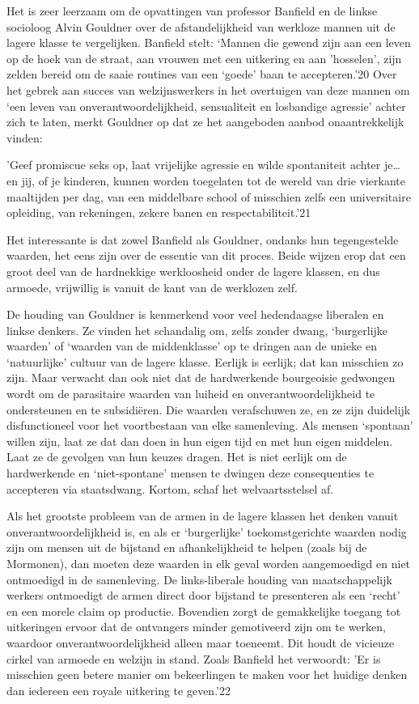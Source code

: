 \documentclass[
  a5paper,
  smalldemyvopaper,10pt,twoside,onecolumn,openright,extrafontsizes,hidelinks]{memoir}
\renewenvironment{quote}%
               {\list{}{\rightmargin=.6cm\leftmargin=.6cm}%
                \itshape \item[]}%
               {\endlist}
\begin{document}
Het is zeer leerzaam om de opvattingen van professor Banfield en de
linkse socioloog Alvin Gouldner over de afstandelijkheid van werkloze
mannen uit de lagere klasse te vergelijken. Banfield stelt: `Mannen die
gewend zijn aan een leven op de hoek van de straat, aan vrouwen met een
uitkering en aan 'hosselen', zijn zelden bereid om de saaie routines van
een `goede' baan te accepteren.'20 Over het gebrek aan succes van
welzijnswerkers in het overtuigen van deze mannen om `een leven van
onverantwoordelijkheid, sensualiteit en losbandige agressie' achter zich
te laten, merkt Gouldner op dat ze het aangeboden aanbod onaantrekkelijk
vinden:

\begin{quote}
'Geef promiscue seks op, laat vrijelijke agressie en wilde spontaniteit
achter je\ldots{} en jij, of je kinderen, kunnen worden toegelaten tot
de wereld van drie vierkante maaltijden per dag, van een middelbare
school of misschien zelfs een universitaire opleiding, van rekeningen,
zekere banen en respectabiliteit.'21
\end{quote}

Het interessante is dat zowel Banfield als Gouldner, ondanks hun
tegengestelde waarden, het eens zijn over de essentie van dit proces.
Beide wijzen erop dat een groot deel van de hardnekkige werkloosheid
onder de lagere klassen, en dus armoede, vrijwillig is vanuit de kant
van de werklozen zelf.

De houding van Gouldner is kenmerkend voor veel hedendaagse liberalen en
linkse denkers. Ze vinden het schandalig om, zelfs zonder dwang,
`burgerlijke waarden' of `waarden van de middenklasse' op te dringen aan
de unieke en `natuurlijke' cultuur van de lagere klasse. Eerlijk is
eerlijk; dat kan misschien zo zijn. Maar verwacht dan ook niet dat de
hardwerkende bourgeoisie gedwongen wordt om de parasitaire waarden van
luiheid en onverantwoordelijkheid te ondersteunen en te subsidiëren. Die
waarden verafschuwen ze, en ze zijn duidelijk disfunctioneel voor het
voortbestaan van elke samenleving. Als mensen `spontaan' willen zijn,
laat ze dat dan doen in hun eigen tijd en met hun eigen middelen. Laat
ze de gevolgen van hun keuzes dragen. Het is niet eerlijk om de
hardwerkende en `niet-spontane' mensen te dwingen deze consequenties te
accepteren via staatsdwang. Kortom, schaf het welvaartsstelsel af.

Als het grootste probleem van de armen in de lagere klassen het denken
vanuit onverantwoordelijkheid is, en als er `burgerlijke'
toekomstgerichte waarden nodig zijn om mensen uit de bijstand en
afhankelijkheid te helpen (zoals bij de Mormonen), dan moeten deze
waarden in elk geval worden aangemoedigd en niet ontmoedigd in de
samenleving. De links-liberale houding van maatschappelijk werkers
ontmoedigt de armen direct door bijstand te presenteren als een `recht'
en een morele claim op productie. Bovendien zorgt de gemakkelijke
toegang tot uitkeringen ervoor dat de ontvangers minder gemotiveerd zijn
om te werken, waardoor onverantwoordelijkheid alleen maar toeneemt. Dit
houdt de vicieuze cirkel van armoede en welzijn in stand. Zoals Banfield
het verwoordt: 'Er is misschien geen betere manier om bekeerlingen te
maken voor het huidige denken dan iedereen een royale uitkering te
geven.'22
\end{document}
